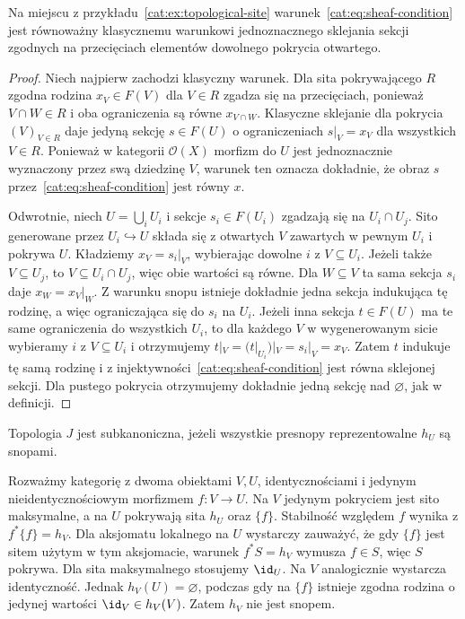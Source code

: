 \begin{twierdzenie}\label{cat:thm:topological-sheaf-equivalence}
Na miejscu z przykładu~\ref{cat:ex:topological-site} warunek~\eqref{cat:eq:sheaf-condition} jest równoważny klasycznemu warunkowi jednoznacznego sklejania sekcji zgodnych na przecięciach elementów dowolnego pokrycia otwartego.
\end{twierdzenie}
\begin{proof}
Niech najpierw zachodzi klasyczny warunek. Dla sita pokrywającego $R$ zgodna rodzina $x_V\in F(V)$ dla $V\in R$ zgadza się na przecięciach, ponieważ $V\cap W\in R$ i oba ograniczenia są równe $x_{V\cap W}$. Klasyczne sklejanie dla pokrycia $(V)_{V\in R}$ daje jedyną sekcję $s\in F(U)$ o ograniczeniach $s|_V=x_V$ dla wszystkich $V\in R$. Ponieważ w kategorii $\mathcal O(X)$ morfizm do $U$ jest jednoznacznie wyznaczony przez swą dziedzinę $V$, warunek ten oznacza dokładnie, że obraz $s$ przez~\eqref{cat:eq:sheaf-condition} jest równy $x$.

Odwrotnie, niech $U=\bigcup_i U_i$ i sekcje $s_i\in F(U_i)$ zgadzają się na $U_i\cap U_j$. Sito generowane przez $U_i\hookrightarrow U$ składa się z otwartych $V$ zawartych w pewnym $U_i$ i pokrywa $U$. Kładziemy $x_V=s_i|_V$, wybierając dowolne $i$ z $V\subseteq U_i$. Jeżeli także $V\subseteq U_j$, to $V\subseteq U_i\cap U_j$, więc obie wartości są równe. Dla $W\subseteq V$ ta sama sekcja $s_i$ daje $x_W=x_V|_W$. Z warunku snopu istnieje dokładnie jedna sekcja indukująca tę rodzinę, a więc ograniczająca się do $s_i$ na $U_i$. Jeżeli inna sekcja $t\in F(U)$ ma te same ograniczenia do wszystkich $U_i$, to dla każdego $V$ w wygenerowanym sicie wybieramy $i$ z $V\subseteq U_i$ i otrzymujemy $t|_V=(t|_{U_i})|_V=s_i|_V=x_V$. Zatem $t$ indukuje tę samą rodzinę i z injektywności~\eqref{cat:eq:sheaf-condition} jest równa sklejonej sekcji. Dla pustego pokrycia otrzymujemy dokładnie jedną sekcję nad $\varnothing$, jak w definicji.
\end{proof}

\begin{definicja}\label{cat:def:subcanonical}
Topologia $J$ jest subkanoniczna, jeżeli wszystkie presnopy reprezentowalne $h_U$ są snopami.
\end{definicja}

\begin{przyklad}\label{cat:ex:nonsubcanonical}
Rozważmy kategorię z dwoma obiektami $V,U$, identycznościami i jedynym nieidentycznościowym morfizmem $f:V\to U$. Na $V$ jedynym pokryciem jest sito maksymalne, a na $U$ pokrywają sita $h_U$ oraz $\{f\}$. Stabilność względem $f$ wynika z $f^*\{f\}=h_V$. Dla aksjomatu lokalnego na $U$ wystarczy zauważyć, że gdy $\{f\}$ jest sitem użytym w tym aksjomacie, warunek $f^*S=h_V$ wymusza $f\in S$, więc $S$ pokrywa. Dla sita maksymalnego stosujemy $\id_U$. Na $V$ analogicznie wystarcza identyczność. Jednak $h_V(U)=\varnothing$, podczas gdy na $\{f\}$ istnieje zgodna rodzina o jedynej wartości $\id_V\in h_V(V)$. Zatem $h_V$ nie jest snopem.
\end{przyklad}

